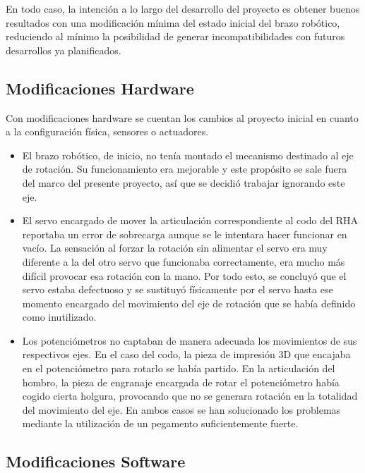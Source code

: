 En todo caso, la intención a lo largo del desarrollo del proyecto es obtener buenos resultados con una modificación mínima del estado inicial del brazo robótico, reduciendo al mínimo la posibilidad de generar incompatibilidades con futuros desarrollos ya planificados.

\subsection{Modificaciones Hardware}

Con modificaciones hardware se cuentan los cambios al proyecto inicial en cuanto a la configuración física, sensores o actuadores.

\begin{itemize}
\item El brazo robótico, de inicio, no tenía montado el mecanismo destinado al eje de rotación. Su funcionamiento era mejorable y este propósito se sale fuera del marco del presente proyecto, así que se decidió trabajar ignorando este eje.

\item El servo encargado de mover la articulación correspondiente al codo del RHA reportaba un error de sobrecarga aunque se le intentara hacer funcionar en vacío. La sensación al forzar la rotación sin alimentar el servo era muy diferente a la del otro servo que funcionaba correctamente, era mucho más difícil provocar esa rotación con la mano. Por todo esto, se concluyó que el servo estaba defectuoso y se sustituyó físicamente por el servo hasta ese momento encargado del movimiento del eje de rotación que se había definido como inutilizado.

\item Los potenciómetros no captaban de manera adecuada los movimientos de sus respectivos ejes. En el caso del codo, la pieza de impresión 3D que encajaba en el potenciómetro para rotarlo se había partido. En la articulación del hombro, la pieza de engranaje encargada de rotar el potenciómetro había cogido cierta holgura, provocando que no se generara rotación en la totalidad del movimiento del eje. En ambos casos se han solucionado los problemas mediante la utilización de un pegamento suficientemente fuerte.
\end{itemize}


\subsection{Modificaciones Software}

